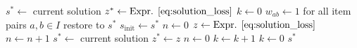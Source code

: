 \begin{algorithm}[htbp]
    \caption{\texttt{separate}($k_\text{max}, n_\text{max}$)}
    \begin{algorithmic}[1]
        \State $s^* \gets$ current solution
        \SemiCol $z^* \gets \text{Expr. \ref{eq:solution_loss}}$
        \SemiCol $k \gets 0$
        \State $w_{ab} \gets 1$ for all item pairs $a,b \in I$ 
            \State restore to ${s^*}$ 
            \SemiCol $s_\text{init} \gets s^*$
            \SemiCol $n \gets 0$ 
                \State {}
                \State {}
                \State $z \gets \text{Expr. \ref{eq:solution_loss}}$
                \SemiCol $n \gets n + 1$
                 
                    \State $s^* \gets$ current solution
                    \SemiCol $z^* \gets z$
                    \State $n \gets 0$                    
                \EndIf
            \EndWhile
            \State $k \gets k + 1$ 
            \State $k \gets 0$ 
            \EndIf
        \EndWhile
        \State \Return $s^*$
    \end{algorithmic}
    \label{alg:separate}
\end{algorithm}